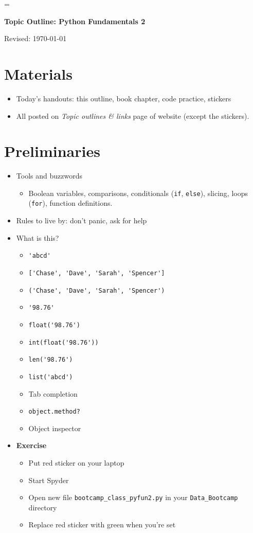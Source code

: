 \documentclass[11pt]{article}
\begin{document}
\parskip=\bigskipamount
\parindent=0.0in
\thispagestyle{empty}


\bigskip\bigskip
\centerline{\Large \bf Topic Outline:  Python Fundamentals 2}
\centerline{Revised: \today}


\section*{Materials}

\begin{itemize}
\item  Today's handouts:  this outline, book chapter, code practice, stickers
\item  All posted on {\it Topic outlines \& links\/} page of website (except the stickers).
\end{itemize}


\section*{Preliminaries}

\begin{itemize}

\item Tools and buzzwords
\begin{itemize}
\item Boolean variables, comparisons, conditionals ({\tt if}, {\tt else}), slicing,
loops ({\tt for}), function definitions.
\end{itemize}

\item Rules to live by:  don't panic, ask for help

\item What is this?
\begin{itemize}
\item \verb|'abcd' |
\item \verb|['Chase', 'Dave', 'Sarah', 'Spencer'] |
\item \verb|('Chase', 'Dave', 'Sarah', 'Spencer') |
\item \verb|'98.76'|
\item \verb|float('98.76')|
\item \verb|int(float('98.76'))|
\item \verb|len('98.76')|
\item \verb|list('abcd')|
\item Tab completion
\item {\tt object.method?}
\item Object inspector
\end{itemize}

\item {\bf Exercise}
\begin{itemize}
\item Put red sticker on your laptop
\item Start Spyder
\item Open new file  \verb|bootcamp_class_pyfun2.py|
in your \verb|Data_Bootcamp| directory
\item Replace red sticker with green when you're set
\end{itemize}

\end{itemize}
\end{document}

